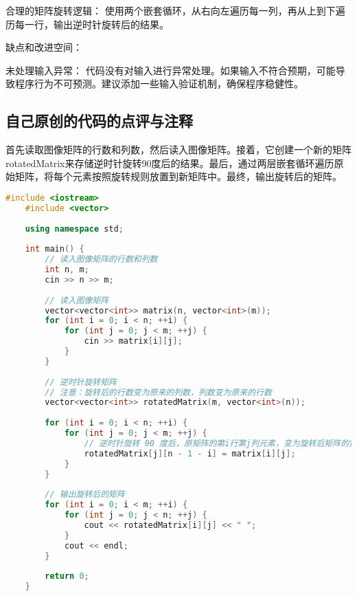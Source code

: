 合理的矩阵旋转逻辑： 使用两个嵌套循环，从右向左遍历每一列，再从上到下遍历每一行，输出逆时针旋转后的结果。

缺点和改进空间：

未处理输入异常： 代码没有对输入进行异常处理。如果输入不符合预期，可能导致程序行为不可预测。建议添加一些输入验证机制，确保程序稳健性。

\subsection{自己原创的代码的点评与注释}

首先读取图像矩阵的行数和列数，然后读入图像矩阵。接着，它创建一个新的矩阵rotatedMatrix来存储逆时针旋转90度后的结果。最后，通过两层嵌套循环遍历原始矩阵，将每个元素按照旋转规则放置到新矩阵中。最终，输出旋转后的矩阵。

\begin{lstlisting}[language=C++]
    #include <iostream>
    #include <vector>
    
    using namespace std;
    
    int main() {
        // 读入图像矩阵的行数和列数
        int n, m;
        cin >> n >> m;
    
        // 读入图像矩阵
        vector<vector<int>> matrix(n, vector<int>(m));
        for (int i = 0; i < n; ++i) {
            for (int j = 0; j < m; ++j) {
                cin >> matrix[i][j];
            }
        }
    
        // 逆时针旋转矩阵
        // 注意：旋转后的行数变为原来的列数，列数变为原来的行数
        vector<vector<int>> rotatedMatrix(m, vector<int>(n));
    
        for (int i = 0; i < n; ++i) {
            for (int j = 0; j < m; ++j) {
                // 逆时针旋转 90 度后，原矩阵的第i行第j列元素，变为旋转后矩阵的第j行第(n-1-i)列元素
                rotatedMatrix[j][n - 1 - i] = matrix[i][j];
            }
        }
    
        // 输出旋转后的矩阵
        for (int i = 0; i < m; ++i) {
            for (int j = 0; j < n; ++j) {
                cout << rotatedMatrix[i][j] << " ";
            }
            cout << endl;
        }
    
        return 0;
    }    
\end{lstlisting}